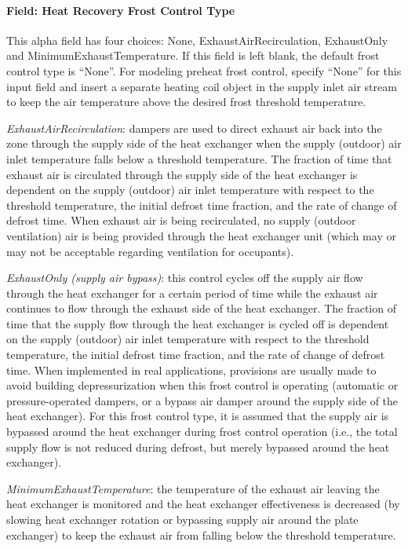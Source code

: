 \paragraph{Field: Heat Recovery Frost Control Type}\label{field-heat-recovery-frost-control-type}

This alpha field has four choices: None, ExhaustAirRecirculation, ExhaustOnly and MinimumExhaustTemperature. If this field is left blank, the default frost control type is ``None''. For modeling preheat frost control, specify ``None'' for this input field and insert a separate heating coil object in the supply inlet air stream to keep the air temperature above the desired frost threshold temperature.

\emph{ExhaustAirRecirculation}: dampers are used to direct exhaust air back into the zone through the supply side of the heat exchanger when the supply (outdoor) air inlet temperature falls below a threshold temperature. The fraction of time that exhaust air is circulated through the supply side of the heat exchanger is dependent on the supply (outdoor) air inlet temperature with respect to the threshold temperature, the initial defrost time fraction, and the rate of change of defrost time. When exhaust air is being recirculated, no supply (outdoor ventilation) air is being provided through the heat exchanger unit (which may or may not be acceptable regarding ventilation for occupants).

\emph{ExhaustOnly (supply air bypass)}: this control cycles off the supply air flow through the heat exchanger for a certain period of time while the exhaust air continues to flow through the exhaust side of the heat exchanger. The fraction of time that the supply flow through the heat exchanger is cycled off is dependent on the supply (outdoor) air inlet temperature with respect to the threshold temperature, the initial defrost time fraction, and the rate of change of defrost time. When implemented in real applications, provisions are usually made to avoid building depressurization when this frost control is operating (automatic or pressure-operated dampers, or a bypass air damper around the supply side of the heat exchanger). For this frost control type, it is assumed that the supply air is bypassed around the heat exchanger during frost control operation (i.e., the total supply flow is not reduced during defrost, but merely bypassed around the heat exchanger).

\emph{MinimumExhaustTemperature}: the temperature of the exhaust air leaving the heat exchanger is monitored and the heat exchanger effectiveness is decreased (by slowing heat exchanger rotation or bypassing supply air around the plate exchanger) to keep the exhaust air from falling below the threshold temperature.

